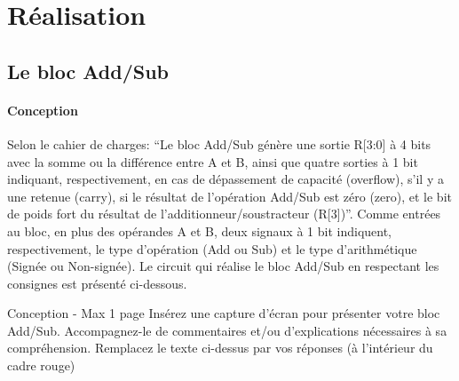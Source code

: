\documentclass[a4paper]{article}
\begin{document}
\section{Réalisation}
\subsection{Le bloc Add/Sub} \label{add_Sub}

\paragraph{Conception}
Selon le cahier de charges: “Le bloc Add/Sub génère une sortie R[3:0] à 4 bits avec la somme ou la différence entre A et B, ainsi que quatre sorties à 1 bit indiquant, respectivement, en cas de dépassement de capacité (overflow), s’il y a une retenue (carry), si le résultat de l’opération Add/Sub est zéro (zero), et le bit de poids fort du résultat de l’additionneur/soustracteur (R[3])”. Comme entrées au bloc, en plus des opérandes A et B, deux signaux à 1 bit indiquent, respectivement, le type d’opération (Add ou Sub) et le type d’arithmétique (Signée ou Non-signée). Le circuit qui réalise le bloc Add/Sub en respectant les consignes est présenté ci-dessous.\\


\begin{tcolorbox}[colframe=Monokaimagenta,colback=white]
Conception - Max 1 page 
Insérez une capture d’écran pour présenter votre bloc Add/Sub.
Accompagnez-le de commentaires et/ou d’explications nécessaires à sa compréhension.
Remplacez le texte ci-dessus par vos réponses (à l’intérieur du cadre rouge)
\end{tcolorbox}
\end{document}
